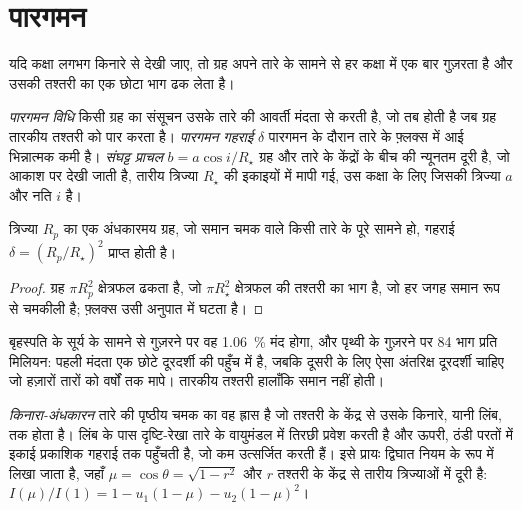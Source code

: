 \section{पारगमन}\label{sec:b3:exoplanets:transits}

यदि कक्षा लगभग किनारे से देखी जाए, तो ग्रह अपने तारे के सामने से
हर कक्षा में एक बार गुज़रता है और उसकी तश्तरी का एक छोटा भाग ढक लेता है।

\begin{definition}\label{def:b3:exoplanets:transit}
\emph{पारगमन विधि} किसी ग्रह का संसूचन उसके तारे की
आवर्ती मंदता से करती है, जो तब होती है जब ग्रह तारकीय तश्तरी को पार करता है।
\emph{पारगमन गहराई} $\delta$ पारगमन के दौरान तारे के फ़्लक्स में आई
भिन्नात्मक कमी है। \emph{संघट्ट
प्राचल} $b = a\cos i/R_\star$ ग्रह और तारे के केंद्रों के बीच की
न्यूनतम दूरी है, जो आकाश पर देखी जाती है,
तारीय त्रिज्या $R_\star$ की इकाइयों में मापी गई, उस कक्षा के लिए जिसकी
त्रिज्या $a$ और नति $i$ है।
\end{definition}

\begin{proposition}\label{prop:b3:exoplanets:depth}
त्रिज्या $R_p$ का एक अंधकारमय ग्रह, जो समान चमक वाले किसी तारे के पूरे सामने हो,
गहराई $\delta = (R_p/R_\star)^2$ प्राप्त होती है।
\end{proposition}

\begin{proof}
ग्रह $\pi R_p^2$ क्षेत्रफल ढकता है, जो $\pi R_\star^2$ क्षेत्रफल की तश्तरी का भाग है,
जो हर जगह समान रूप से चमकीली है; फ़्लक्स उसी अनुपात में घटता है।
\end{proof}

बृहस्पति के सूर्य के सामने से गुज़रने पर वह \qty{1.06}{\percent} मंद होगा,
और पृथ्वी के गुज़रने पर \num{84} भाग प्रति मिलियन: पहली मंदता एक छोटे दूरदर्शी की पहुँच में है,
जबकि दूसरी के लिए ऐसा अंतरिक्ष दूरदर्शी चाहिए जो हज़ारों तारों को
वर्षों तक मापे। तारकीय तश्तरी हालाँकि समान नहीं होती।

\begin{definition}[किनारा-अंधकारन]\label{def:b3:exoplanets:limb}
\emph{किनारा-अंधकारन} तारे की पृष्ठीय चमक का वह ह्रास है
जो तश्तरी के केंद्र से उसके किनारे, यानी लिंब, तक होता है।
लिंब के पास दृष्टि-रेखा तारे के वायुमंडल में तिरछी प्रवेश करती है
और ऊपरी, ठंडी परतों में इकाई प्रकाशिक गहराई तक पहुँचती है, जो कम उत्सर्जित करती हैं।
इसे प्रायः द्विघात नियम के रूप में लिखा जाता है, जहाँ $\mu = \cos\theta =
\sqrt{1 - r^2}$ और $r$ तश्तरी के केंद्र से तारीय त्रिज्याओं में दूरी है:
$I(\mu)/I(1) = 1 - u_1(1 - \mu) - u_2(1 - \mu)^2$।
\end{definition}

